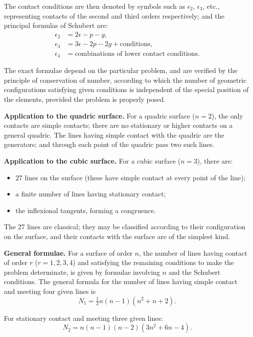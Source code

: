 \documentclass[12pt,a4paper]{article}
\begin{document}
The contact conditions are then denoted by symbols such as $\epsilon_2$,
$\epsilon_3$, etc., representing contacts of the second and third orders respectively;
and the principal formulas of Schubert are:
\begin{align*}
\epsilon_2 &= 2\epsilon - p - g, \\
\epsilon_3 &= 3\epsilon - 2p - 2g + \text{conditions}, \\
\epsilon_4 &= \text{combinations of lower contact conditions}.
\end{align*}

The exact formulae depend on the particular problem, and are verified by
the principle of conservation of number, according to which the number of
geometric configurations satisfying given conditions is independent of the
special position of the elements, provided the problem is properly posed.

\textbf{Application to the quadric surface.} For a quadric surface ($n=2$), the
only contacts are simple contacts; there are no stationary or higher contacts
on a general quadric. The lines having simple contact with the quadric
are the generators; and through each point of the quadric pass two such
lines.

\textbf{Application to the cubic surface.} For a cubic surface ($n=3$), there are:
\begin{itemize}
\item 27 lines on the surface (these have simple contact at every point of the line);
\item a finite number of lines having stationary contact;
\item the inflexional tangents, forming a congruence.
\end{itemize}

The 27 lines are classical; they may be classified according to their
configuration on the surface, and their contacts with the surface are of the
simplest kind.

\textbf{General formulae.} For a surface of order $n$, the number of lines having
contact of order $r$ ($r=1,2,3,4$) and satisfying the remaining conditions
to make the problem determinate, is given by formulae involving $n$ and
the Schubert conditions. The general formula for the number of lines
having simple contact and meeting four given lines is
%
\[
N_1 = \tfrac{1}{2} n(n-1)(n^2 + n + 2).
\]

For stationary contact and meeting three given lines:
%
\[
N_2 = n(n-1)(n-2)(3n^2 + 6n - 4).
\]
\end{document}
